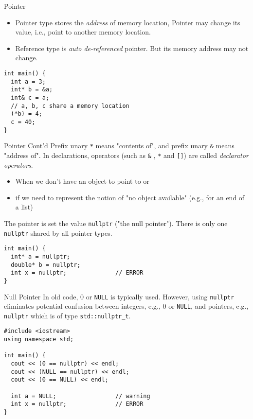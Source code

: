 \documentclass[presentation]{beamer}
\begin{document}
\begin{frame}[fragile,label={sec:orgheadline28}]{Pointer}
 \begin{itemize}
\item Pointer type stores the \emph{address} of memory location, Pointer may
change its value, i.e., point to another memory location.
\item Reference type is \emph{auto de-referenced} pointer.  But its memory
address may not change.
\end{itemize}

\begin{verbatim}
int main() {
  int a = 3;
  int* b = &a;
  int& c = a;
  // a, b, c share a memory location
  (*b) = 4;
  c = 40;
}
\end{verbatim}
\end{frame}

\begin{frame}[fragile,label={sec:orgheadline29}]{Pointer Cont'd}
 Prefix unary \texttt{*} means "contents of", and prefix unary \texttt{\&} means
"address of".  In declarations, operators (such as \texttt{\&} , \texttt{*} and
\texttt{[]}) are called \emph{declarator operators}.


\begin{itemize}
\item When we don't have an object to point to or
\item if we need to represent the notion of "no object available"
(e.g., for an end of a list)
\end{itemize}

The pointer is set the value \texttt{nullptr} ("the null pointer").  There
is only one \texttt{nullptr} shared by all pointer types.

\begin{verbatim}
int main() {
  int* a = nullptr;
  double* b = nullptr;
  int x = nullptr;              // ERROR
}
\end{verbatim}
\end{frame}

\begin{frame}[fragile,label={sec:orgheadline30}]{Null Pointer}
 In old code, 0 or \texttt{NULL} is typically used.  However, using
\texttt{nullptr} eliminates potential confusion between integers, e.g., 0
or \texttt{NULL}, and pointers, e.g., \texttt{nullptr} which is of type
\texttt{std::nullptr\_t}.

\begin{verbatim}
#include <iostream>
using namespace std;

int main() {
  cout << (0 == nullptr) << endl;
  cout << (NULL == nullptr) << endl;
  cout << (0 == NULL) << endl;

  int a = NULL;                 // warning
  int x = nullptr;              // ERROR
}
\end{verbatim}
\end{frame}
\end{document}
